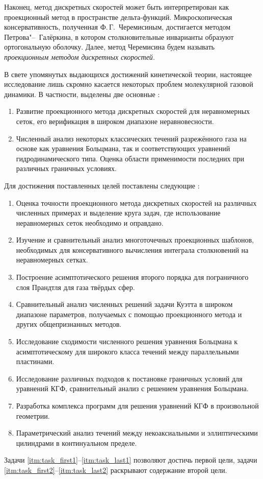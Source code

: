 Наконец, метод дискретных скоростей может быть интерпретирован как проекционный метод в пространстве дельта-функций.
Микроскопическая консервативность, полученная Ф.\,Г.~Черемисиным, достигается методом Петрова"--~Галёркина,
в котором столкновительные инварианты образуют ортогональную оболочку.
Далее, метод Черемисина будем называть \emph{проекционным методом дискретных скоростей}.

В свете упомянутых выдающихся достижений кинетической теории, настоящее исследование лишь скромно
касается некоторых проблем молекулярной газовой динамики. В частности, выделены две основные {\aim}:
\begin{enumerate}
    \item Развитие проекционного метода дискретных скоростей для неравномерных сеток,
    его верификация в широком диапазоне неравновесности.
    \item Численный анализ некоторых классических течений разрежённого газа на основе
    как уравнения Больцмана, так и соответствующих уравнений гидродинамического типа.
    Оценка области применимости последних при различных граничных условиях.
\end{enumerate}
Для достижения поставленных целей поставлены следующие {\tasks}:
\begin{enumerate}
    \item Оценка точности проекционного метода дискретных скоростей на различных численных примерах
    и выделение круга задач, где использование неравномерных сеток необходимо и оправдано.\label{itm:task_first1}
    \item Изучение и сравнительный анализ многоточечных проекционных шаблонов,
    необходимых для консервативного вычисления интеграла столкновений на неравномерных сетках.
    \item Построение асимптотического решения второго порядка
    для пограничного слоя Прандтля для газа твёрдых сфер. \label{itm:task_first2}
    \item Сравнительный анализ численных решений задачи Куэтта в широком диапазоне параметров,
    получаемых с помощью проекционного метода и других общепризнанных методов.
    \item Исследование сходимости численного решения уравнения Больцмана к асимптотическому
    для широкого класса течений между параллельными пластинами.
    \item Исследование различных подходов к постановке граничных условий для уравнений КГФ,
    сравнительный анализ с решением уравнения Больцмана.\label{itm:task_last1}
    \item Разработка комплекса программ для решения уравнений КГФ в произвольной геометрии.
    \item Параметрический анализ течений между некоаксиальными и эллиптическими цилиндрами
    в континуальном пределе.\label{itm:task_last2}
\end{enumerate}
Задачи \ref{itm:task_first1}--\ref{itm:task_last1} позволяют достичь первой цели,
задачи \ref{itm:task_first2}--\ref{itm:task_last2} раскрывают содержание второй цели.

